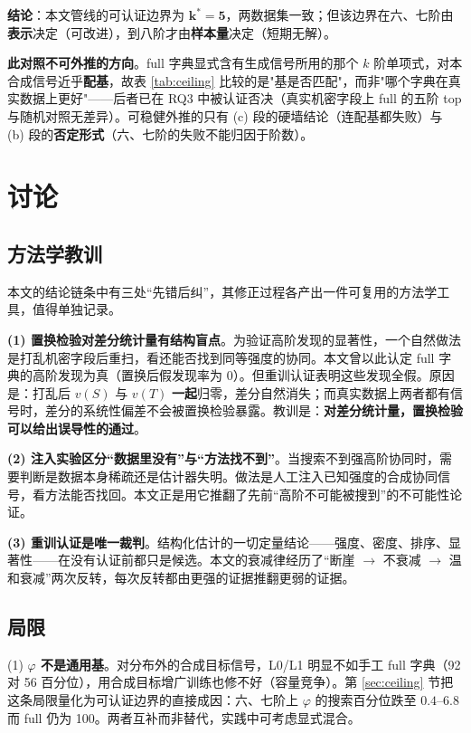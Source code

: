 \documentclass[10.5pt,compsoc,UTF8]{CjC}
\theoremstyle{mystyle}
\begin{document}
\textbf{结论}：本文管线的可认证边界为 $\boldsymbol{k^\ast=5}$，两数据集一致；但该边界在六、七阶由\textbf{表示}决定（可改进），到八阶才由\textbf{样本量}决定（短期无解）。

\textbf{此对照不可外推的方向}。full 字典显式含有生成信号所用的那个 $k$ 阶单项式，对本合成信号近乎\textbf{配基}，故表 \ref{tab:ceiling} 比较的是"基是否匹配"，而非"哪个字典在真实数据上更好"——后者已在 RQ3 中被认证否决（真实机密字段上 full 的五阶 top 与随机对照无差异）。可稳健外推的只有 (c) 段的硬墙结论（连配基都失败）与 (b) 段的\textbf{否定形式}（六、七阶的失败不能归因于阶数）。

\section{\heiti 讨论}

\subsection{方法学教训}

本文的结论链条中有三处“先错后纠”，其修正过程各产出一件可复用的方法学工具，值得单独记录。

\textbf{(1) 置换检验对差分统计量有结构盲点}。为验证高阶发现的显著性，一个自然做法是打乱机密字段后重扫，看还能否找到同等强度的协同。本文曾以此认定 full 字典的高阶发现为真（置换后假发现率为 0）。但重训认证表明这些发现全假。原因是：打乱后 $v(S)$ 与 $v(T)$ \textbf{一起}归零，差分自然消失；而真实数据上两者都有信号时，差分的系统性偏差不会被置换检验暴露。教训是：\textbf{对差分统计量，置换检验可以给出误导性的通过}。

\textbf{(2) 注入实验区分“数据里没有”与“方法找不到”}。当搜索不到强高阶协同时，需要判断是数据本身稀疏还是估计器失明。做法是人工注入已知强度的合成协同信号，看方法能否找回。本文正是用它推翻了先前“高阶不可能被搜到”的不可能性论证。

\textbf{(3) 重训认证是唯一裁判}。结构化估计的一切定量结论——强度、密度、排序、显著性——在没有认证前都只是候选。本文的衰减律经历了“断崖 $\to$ 不衰减 $\to$ 温和衰减”两次反转，每次反转都由更强的证据推翻更弱的证据。

\subsection{局限}
\label{sec:limit}

(1) \textbf{$\varphi$ 不是通用基}。对分布外的合成目标信号，L0/L1 明显不如手工 full 字典（92 对 56 百分位），用合成目标增广训练也修不好（容量竞争）。第 \ref{sec:ceiling} 节把这条局限量化为可认证边界的直接成因：六、七阶上 $\varphi$ 的搜索百分位跌至 $0.4$--$6.8$ 而 full 仍为 100。两者互补而非替代，实践中可考虑显式混合。
\end{document}
